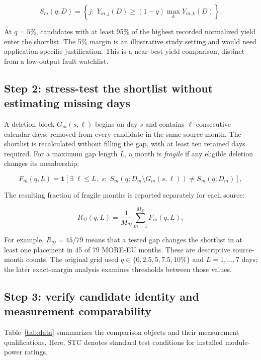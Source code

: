 \documentclass[preprint,12pt]{elsarticle}
\begin{document}
\begin{equation}
S_m(q;D)=\left\{j:\;Y_{m,j}(D)\geq (1-q)\max_k Y_{m,k}(D)\right\}.
\label{eq:shortlist}
\end{equation}

At $q=5\%$, candidates with at least 95\% of the highest recorded normalized yield enter the shortlist. The 5\% margin is an illustrative study setting and would need application-specific justification. This is a near-best yield comparison, distinct from a low-output fault watchlist.

\subsection{Step 2: stress-test the shortlist without estimating missing days}
A deletion block $G_m(s,\ell)$ begins on day $s$ and contains $\ell$ consecutive calendar days, removed from every candidate in the same source-month. The shortlist is recalculated without filling the gap, with at least ten retained days required. For a maximum gap length $L$, a month is \emph{fragile} if any eligible deletion changes its membership:

\begin{equation}
F_m(q,L)=\mathbf{1}\left[\exists\;\ell\leq L,\;s:\;S_m(q;D_m\setminus G_m(s,\ell))\neq S_m(q;D_m)\right],
\label{eq:fragile}
\end{equation}

The resulting fraction of fragile months is reported separately for each source:

\begin{equation}
R_{\mathcal{D}}(q,L)=\frac{1}{M_{\mathcal{D}}}\sum_{m=1}^{M_{\mathcal{D}}}F_m(q,L),
\label{eq:surface}
\end{equation}

For example, $R_{\mathcal{D}}=45/79$ means that a tested gap changes the shortlist in at least one placement in 45 of 79 MORE-EU months. These are descriptive source-month counts. The original grid used $q\in\{0,2.5,5,7.5,10\%\}$ and $L=1,\ldots,7$ days; the later exact-margin analysis examines thresholds between those values.

\subsection{Step 3: verify candidate identity and measurement comparability}
Table~\ref{tab:data} summarizes the comparison objects and their measurement qualifications. Here, STC denotes standard test conditions for installed module-power ratings.
\end{document}
